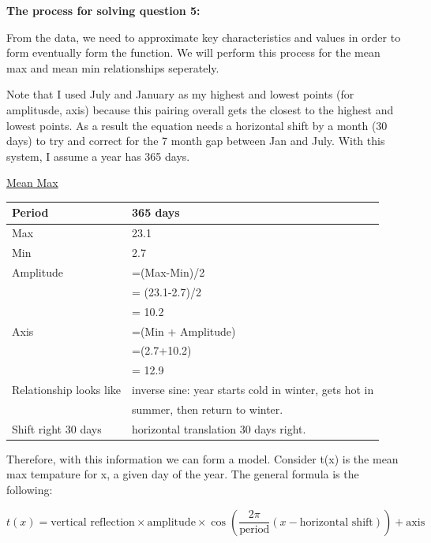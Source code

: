 \documentclass[12pt]{book}
\begin{document}
\begin{enumerate}
\vspace{0.3cm}
\textbf{The process for solving question 5:}

\vspace{0.3cm}
From the data, we need to approximate key characteristics and values in order to form 
eventually form the function. We will perform this process for the mean max and mean 
min relationships seperately.

\vspace{0.3cm}
Note that I used July and January as my highest and lowest points (for amplitusde, axis) 
because this pairing overall gets the closest to the highest and lowest points. As a result 
the equation needs a horizontal shift by a month (30 days) to try and correct for the 7 month 
gap between Jan and July. With this system, I assume a year has 365 days.

\vspace{0.3cm}
\underline{Mean Max}

\vspace{0.3cm}
\begin{tabular}{|l|l|}
    \hline
    Period & 365 days \\
    \hline
    Max & 23.1 \\
    \hline
    Min & 2.7 \\
    \hline
    Amplitude & =(Max-Min)/2\\
    & = (23.1-2.7)/2 \\
    & = 10.2 \\
    \hline
    Axis & =(Min + Amplitude)\\
    & =(2.7+10.2) \\
    & = 12.9 \\
    \hline
    Relationship looks like & inverse sine: year starts cold in winter, gets hot in \\
    & summer, then return to winter. \\
    \hline
    Shift right 30 days & horizontal translation 30 days right. \\
    \hline
\end{tabular}

\newpage

\vspace{0.3cm}
Therefore, with this information we can form a model. 
Consider t(x) is the mean max tempature for x, a given day of the year. 
The general formula is the following:

$$t(x) = \text{vertical reflection} \times \text{amplitude} \times \cos\left( \dfrac{2\pi}{\text{period}}  (x - \text{horizontal shift}) \right) + \text{axis}$$


\end{enumerate}
\end{document}
